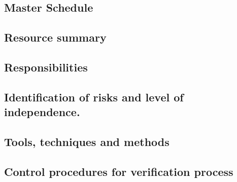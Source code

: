 
\subsection{Master Schedule}


\subsection{Resource summary}


\subsection{Responsibilities}


\subsection{Identification of risks and level of independence.}


\subsection{Tools, techniques and methods}


\subsection{Control procedures for verification process}

